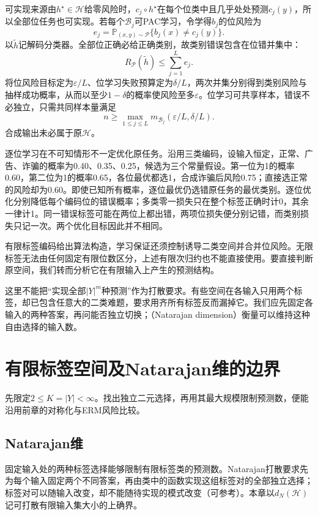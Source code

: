 可实现来源由$h^\star\in\mathcal H$给零风险时，$c_j\circ h^\star$在每个位类中且几乎处处预测$c_j(y)$，所以全部位任务也可实现。若每个$\mathcal B_j$可PAC学习，令学得$b_j$的位风险为
\[
 e_j=\mathbb P_{(x,y)\sim\mathcal P}\{b_j(x)\neq c_j(y)\}.
\]
以$\tilde h$记解码分类器。全部位正确必给正确类别，故类别错误包含在位错并集中：
\[
 R_{\mathcal P}(\tilde h)\leq\sum_{j=1}^L e_j.
\]
将位风险目标定为$\varepsilon/L$、位学习失败预算定为$\delta/L$，两次并集分别得到类别风险与抽样成功概率，从而以至少$1-\delta$的概率使风险至多$\varepsilon$。位学习可共享样本，错误不必独立，只需共同样本量满足
\[
 n\geq\max_{1\leq j\leq L}
 m_{\mathcal B_j}(\varepsilon/L,\delta/L).
\]
合成输出未必属于原$\mathcal H$。

逐位学习在不可知情形不一定优化原任务。沿用三类编码，设输入恒定，正常、广告、诈骗的概率为0.40、0.35、0.25，候选为三个常量假设。第一位为1的概率0.60，第二位为1的概率0.65，各位最优都选1，合成诈骗后风险0.75；直接选正常的风险却为0.60。即使已知所有概率，逐位最优仍选错原任务的最优类别。逐位优化分别降低每个编码位的错误概率；多类零一损失只在整个标签正确时计0，其余一律计1。同一错误标签可能在两位上都出错，两项位损失便分别记错，而类别损失只记一次。两个优化目标因此并不相同。

有限标签编码给出算法构造，学习保证还须控制诱导二类空间并合并位风险。无限标签无法由任何固定有限位数区分，上述有限次归约也不能直接使用。要直接判断原空间，我们转而分析它在有限输入上产生的预测结构。

这里不能把“实现全部$|Y|^m$种预测”作为打散要求。有些空间在各输入只用两个标签，却已包含任意大的二类难题，要求用齐所有标签反而漏掉它。我们应先固定各输入的两种答案，再问能否独立切换；（Natarajan dimension）衡量可以维持这种自由选择的输入数。

\section{有限标签空间及Natarajan维的边界}
\label{sec:multiclass-dimensions}

先限定$2\leq K=|Y|<\infty$。找出独立二元选择，再用其最大规模限制预测数，便能沿用前章的对称化与ERM风险比较。

\subsection{Natarajan维}

固定输入处的两种标签选择能够限制有限标签类的预测数。Natarajan打散要求先为每个输入固定两个不同答案，再由类中的函数实现这组标签对的全部独立选择；标签对可以随输入改变，却不能随待实现的模式改变（可参考）。本章以$d_N(\mathcal H)$记可打散有限输入集大小的上确界。
\label{eq:learning-natarajan-shattering}


